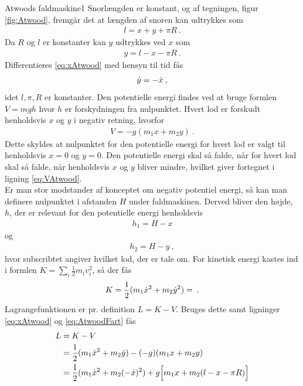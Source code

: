 %
%
\begin{opgave}{Atwoods faldmaskine}{1}
\opg Snorlængden er konstant, og af tegningen, figur \ref{fig:Atwood}, fremgår det at længden af snoren kan udtrykkes som
\begin{align*}
	l = x + y + \pi R \: .
\end{align*}
Da $R$ og $l$ er konstanter kan $y$ udtrykkes ved $x$ som
\begin{align} \label{eq:xAtwood}
	y = l - x - \pi R \: .
\end{align}
\opg Differentieres \eqref{eq:xAtwood} med hensyn til tid fås
\begin{align} \label{eq:AtwoodFart}
	\dot{y} = -\dot{x} \: ,
\end{align}
idet $l,\pi,R$ er konstanter.
\opg Den potentielle energi findes ved at bruge formlen $V = mgh$ hvor $h$ er forskydningen fra nulpunktet. Hvert lod er forskudt henholdsvis $x$ og $y$ i negativ retning, hvorfor
\begin{align} \label{eq:VAtwood}
	V = -g(m_1x + m_2y) \: .
\end{align}
Dette skyldes at nulpunktet for den potentielle energi for hvert lod er valgt til henholdsvis $x=0$ og $y=0$. Den potentielle energi skal så falde, når for hvert lod skal så falde, når henholdsvis $x$ og $y$ bliver mindre, hvilket giver fortegnet i ligning \eqref{eq:VAtwood}. \\
Er man stor modstander af konceptet om negativ potentiel energi, så kan man definere nulpunktet i afstanden $H$ under faldmaskinen. Derved bliver den højde, $h$, der er relevant for den potentielle energi henholdsvis
\begin{align*}
	h_1 = H - x
\end{align*}
og
\begin{align*}
	h_2 = H - y \: ,
\end{align*}
hvor subscribtet angiver hvilket lod, der er tale om.
\opg For kinetisk energi kastes ind i formlen $K = \sum_i\frac{1}{2}m_iv_i^2$, så der fås
\begin{align*}
	K = \frac{1}{2}(m_1\dot{x}^2 + m_2\dot{y}^2) = \: .
\end{align*}
\opg Lagrangefunktionen er pr. definition $L = K - V$. Bruges dette samt ligninger \eqref{eq:xAtwood} og \eqref{eq:AtwoodFart} fås
\begin{align*}
	L &= K - V \\
	&= \frac{1}{2}(m_1\dt{x}^2 + m_2\dt{y}) - (-g)(m_1x + m_2y) \\
	&=  \frac{1}{2}(m_1\dt{x}^2 + m_2(-\dt{x})^2) + g\Big[m_1x + m_2(l - x - \pi R)\Big] \\

\end{align*}
\end{opgave}
